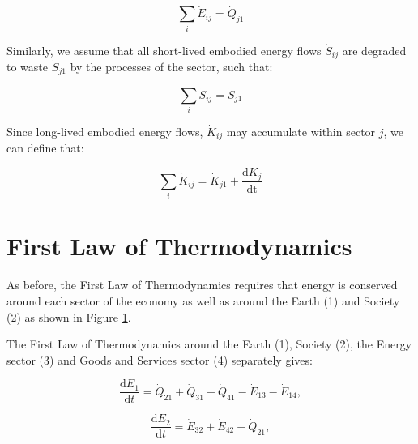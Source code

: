 \begin{equation}\label{eq:D_E_balance}
\sum_{i} \dot{E}_{ij} = \dot{Q}_{j1}
\end{equation}

Similarly, we assume that all short-lived embodied energy flows $\dot{S}_{ij}$ are degraded to waste $\dot{S}_{j1}$ by the processes of the sector, such that:

\begin{equation}\label{eq:D_S_balance}
\sum_{i} \dot{S}_{ij} = \dot{S}_{j1}
\end{equation}

Since long-lived embodied energy flows, $\dot{K}_{ij}$ may accumulate within sector $j$, we can define that:

\begin{equation}\label{eq:D_K_balance}
\sum_{i} \dot{K}_{ij} = \dot{K}_{j1} + \frac{\textrm{d}K_{j}}{\textrm{dt}}
\end{equation}

%

\section{First Law of Thermodynamics}

As before, the First Law of Thermodynamics requires that energy is conserved around each sector of the economy as well as around the Earth (1) and Society (2) as shown in Figure \ref{}. 

The First Law of Thermodynamics around the Earth (1), Society (2), the Energy sector (3) and Goods and Services sector (4) separately gives:

\begin{equation} \label{eq:D-CV_E_dot_1}
	\frac{\mathrm{d}E_{1}}{\mathrm{d}t} 	 =  \dot{Q}_{21} + \dot{Q}_{31} + \dot{Q}_{41} - \dot{E}_{13} - \dot{E}_{14},
\end{equation}

\begin{equation} \label{eq:D-CV_E_dot_2}
	\frac{\mathrm{d}E_{2}}{\mathrm{d}t} 	 = \dot{E}_{32}  + \dot{E}_{42} - \dot{Q}_{21},
\end{equation}

